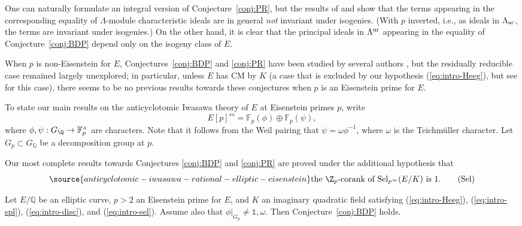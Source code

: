 \begin{rem}
\notready
One can naturally formulate an integral version of Conjecture~\ref{conj:PR}, but the results of \cite{perrinriou} and \cite{howard-GZ} show that the terms appearing in the corresponding equality of $\Lambda$-module characteristic ideals are in general \emph{not} invariant under isogenies. (With $p$ inverted, i.e., as ideals in $\Lambda_{\rm ac}$, the terms are invariant under isogenies.) On the other hand, it is clear that the principal ideals in $\Lambda^{\rm ur}$ appearing in the equality of Conjecture~\ref{conj:BDP} depend only on the isogeny class of $E$.
\end{rem}

When $p$ is non-Eisenstein for $E$, Conjectures~\ref{conj:BDP} and \ref{conj:PR} have been studied by several authors \cite{bertolini,howard,howard-gl2-type,wan-heegner,castellaheights,BCK}, but the residually reducible case remained largely unexplored; in particular, unless $E$ has CM by $K$ (a case that is excluded by our hypothesis (\ref{eq:intro-Heeg}), but see \cite{CMpconverse} for this case), there seems to be no previous results towards these conjectures when $p$ is an Eisenstein prime for $E$.

To state our main results on %
the anticyclotomic Iwasawa theory of $E$ at Eisenstein primes $p$, write
\[
E[p]^{ss}=\mathbb{F}_p(\phi)\oplus\mathbb{F}_p(\psi),
\]
where $\phi,\psi:G_\Q\rightarrow\mathbb{F}_p^\times$ are characters. Note that it follows from the Weil pairing that $\psi=\omega\phi^{-1}$, where $\omega$ is the Teichm\"uller character. Let $G_p\subset G_{\mathbb{Q}}$ be a decomposition group at $p$.

Our most complete results towards Conjectures \ref{conj:BDP} and \ref{conj:PR} are proved under the additional hypothesis
that
\begin{equation}\label{eq:intro-sel}
\source{anticyclotomic-iwasawa-rational-elliptic-eisenstein}
\text{the $\Z_p$-corank of $\mathrm{Sel}_{p^\infty}(E/K)$ is $1$.}\tag{Sel}
\end{equation}

\begin{theorem}
\notready\label{thm:C}
Let $E/\mathbb{Q}$ be an elliptic curve, $p>2$ an Eisenstein prime for $E$, and $K$ an imaginary quadratic field satisfying {\rm (\ref{eq:intro-Heeg})}, {\rm (\ref{eq:intro-spl})}, {\rm (\ref{eq:intro-disc})}, and
{\rm (\ref{eq:intro-sel})}.
Assume also that
$\phi\vert_{G_p}\neq\mathds{1},\omega$. Then Conjecture~\ref{conj:BDP} holds.
\end{theorem}


